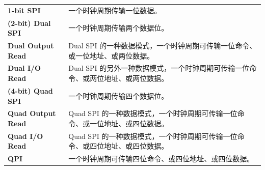 \begin{longtable}[c]{ R{4cm} p{10cm} }
\textbf{1-bit SPI} & 一个时钟周期传输一位数据。\\ 
\textbf{(2-bit) Dual SPI} & 一个时钟周期传输两个数据位。\\
\textbf{Dual Output Read} & Dual SPI 的一种数据模式，一个时钟周期可传输一位命令、或一位地址、或两位数据。\\
\textbf{Dual I/O Read} & Dual SPI 的另外一种数据模式，一个时钟周期可传输一位命令、或两位地址、或两位数据。\\
\textbf{(4-bit) Quad SPI} & 一个时钟周期传输四个数据位。\\
\textbf{Quad Output Read} & Quad SPI 的一种数据模式，一个时钟周期可传输一位命令、或一位地址、或四位数据。\\
\textbf{Quad I/O Read} & Quad SPI 的一种数据模式，一个时钟周期可传输一位命令、或四位地址、或四位数据。\\
\textbf{QPI} & 一个时钟周期可传输四位命令、或四位地址、或四位数据。\\
\end{longtable}
